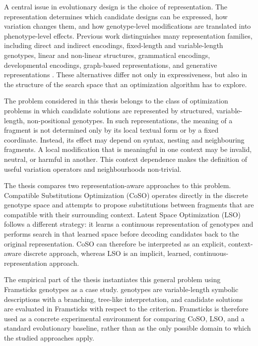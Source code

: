 A central issue in evolutionary design is the choice of representation. The representation determines which candidate designs can be expressed, how variation changes them, and how genotype-level modifications are translated into phenotype-level effects. Previous work distinguishes many representation families, including direct and indirect encodings, fixed-length and variable-length genotypes, linear and non-linear structures, grammatical encodings, developmental encodings, graph-based representations, and generative representations \cite{bentley1999introduction,kicinger2005evolutionary}. These alternatives differ not only in expressiveness, but also in the structure of the search space that an optimization algorithm has to explore.

The problem considered in this thesis belongs to the class of optimization problems in which candidate solutions are represented by structured, variable-length, non-positional genotypes. In such representations, the meaning of a fragment is not determined only by its local textual form or by a fixed coordinate. Instead, its effect may depend on syntax, nesting and neighbouring fragments.
A local modification that is meaningful in one context may be invalid, neutral, or harmful in another. This context dependence makes the definition of useful variation operators and neighbourhoods non-trivial.

The thesis compares two representation-aware approaches to this problem. Compatible Substitutions Optimization (CoSO) operates directly in the discrete genotype space and attempts to propose substitutions between fragments that are compatible with their surrounding context. Latent Space Optimization (LSO) follows a different strategy: it learns a continuous representation of genotypes and performs search in that learned space before decoding candidates back to the original representation. CoSO can therefore be interpreted as an explicit, context-aware discrete approach, whereas LSO is an implicit, learned, continuous-representation approach.

The empirical part of the thesis instantiates this general problem using Framsticks \fone{} genotypes as a case study. \fone{} genotypes are variable-length symbolic descriptions with a branching, tree-like interpretation, and candidate solutions are evaluated in Framsticks with respect to the \vertpos{} criterion. Framsticks is therefore used as a concrete experimental environment for comparing CoSO, LSO, and a standard evolutionary baseline, rather than as the only possible domain to which the studied approaches apply.


